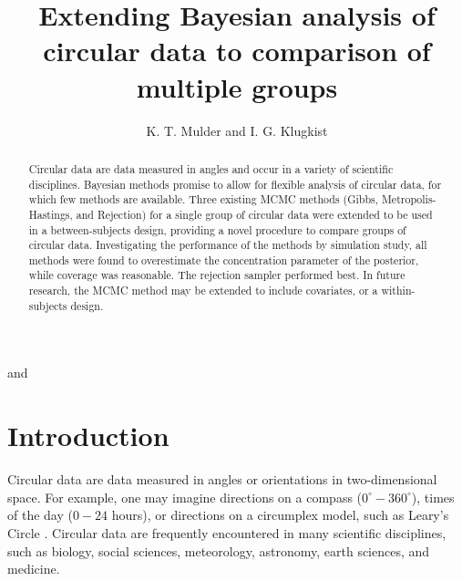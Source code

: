 \documentclass[bib]{ba/ba}
\begin{document}
\renewcommand{\thefootnote}{\fnsymbol{footnote}}
\author{K. T. Mulder and I. G. Klugkist}{
 \footnotemark[1]
and
  \footnotemark[2]
}


\title[Bayesian between-subjects circular data analysis]{Extending Bayesian analysis of circular data to comparison of multiple groups}

\maketitle

\renewcommand{\thefootnote}{\arabic{footnote}}


\begin{abstract}
Circular data are data measured in angles and occur in a variety of scientific disciplines. Bayesian methods promise to allow for flexible analysis of circular data, for which few methods are available. Three existing MCMC methods (Gibbs, Metropolis-Hastings, and Rejection) for a single group of circular data were extended to be used in a between-subjects design, providing a novel procedure to compare groups of circular data. Investigating the performance of the methods by simulation study, all methods were found to overestimate the concentration parameter of the posterior, while coverage was reasonable. The rejection sampler performed best. In future research, the MCMC method may be extended to include covariates, or a within-subjects design. 


\end{abstract}

\section{Introduction}

Circular data are data measured in angles or orientations in two-dimensional space. For example, one may imagine directions on a compass ($0^\circ - 360^\circ$), times of the day ($0 - 24$ hours), or directions on a circumplex model, such as Leary's Circle \citep{Leary1957}. Circular data are frequently encountered in many scientific disciplines, such as biology, social sciences, meteorology, astronomy, earth sciences, and medicine. 
\end{document}
